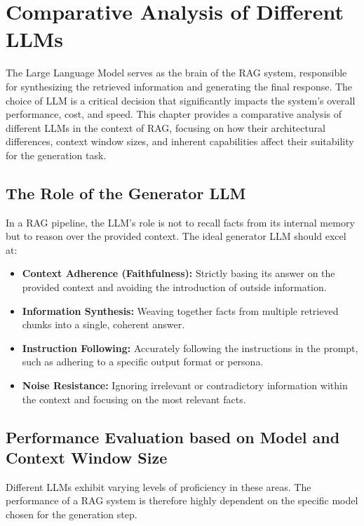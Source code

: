 \chapter{Comparative Analysis of Different LLMs}
\label{chap:llm_comparison}

The Large Language Model serves as the brain of the RAG system, responsible for synthesizing the retrieved information and generating the final response. The choice of LLM is a critical decision that significantly impacts the system's overall performance, cost, and speed. This chapter provides a comparative analysis of different LLMs in the context of RAG, focusing on how their architectural differences, context window sizes, and inherent capabilities affect their suitability for the generation task.

\section{The Role of the Generator LLM}
In a RAG pipeline, the LLM's role is not to recall facts from its internal memory but to reason over the provided context. The ideal generator LLM should excel at:
\begin{itemize}
    \item \textbf{Context Adherence (Faithfulness):} Strictly basing its answer on the provided context and avoiding the introduction of outside information.
    \item \textbf{Information Synthesis:} Weaving together facts from multiple retrieved chunks into a single, coherent answer.
    \item \textbf{Instruction Following:} Accurately following the instructions in the prompt, such as adhering to a specific output format or persona.
    \item \textbf{Noise Resistance:} Ignoring irrelevant or contradictory information within the context and focusing on the most relevant facts.
\end{itemize}

\section{Performance Evaluation based on Model and Context Window Size}
Different LLMs exhibit varying levels of proficiency in these areas. The performance of a RAG system is therefore highly dependent on the specific model chosen for the generation step.

